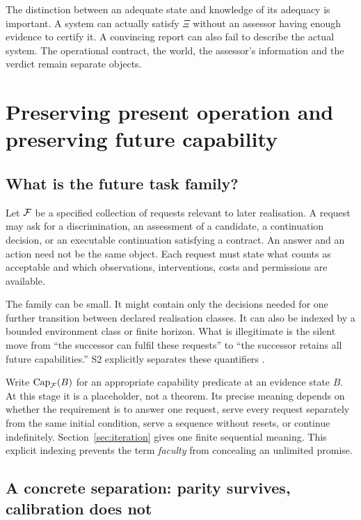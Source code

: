 The distinction between an adequate state and knowledge of its adequacy is important. A system can actually satisfy \(\Xi\) without an assessor having enough evidence to certify it. A convincing report can also fail to describe the actual system. The operational contract, the world, the assessor's information and the verdict remain separate objects.

\section{Preserving present operation and preserving future capability}
\label{sec:futuretarget}

\subsection{What is the future task family?}

Let \(\mathcal F\) be a specified collection of requests relevant to later realisation. A request may ask for a discrimination, an assessment of a candidate, a continuation decision, or an executable continuation satisfying a contract. An answer and an action need not be the same object. Each request must state what counts as acceptable and which observations, interventions, costs and permissions are available.

The family can be small. It might contain only the decisions needed for one further transition between declared realisation classes. It can also be indexed by a bounded environment class or finite horizon. What is illegitimate is the silent move from ``the successor can fulfil these requests'' to ``the successor retains all future capabilities.'' S2 explicitly separates these quantifiers \cite[\S\S2,6,8]{S2}.

Write \(\operatorname{Cap}_\mathcal F(B)\) for an appropriate capability predicate at an evidence state \(B\). At this stage it is a placeholder, not a theorem. Its precise meaning depends on whether the requirement is to answer one request, serve every request separately from the same initial condition, serve a sequence without resets, or continue indefinitely. Section~\ref{sec:iteration} gives one finite sequential meaning. This explicit indexing prevents the term \emph{faculty} from concealing an unlimited promise.

\subsection{A concrete separation: parity survives, calibration does not}

